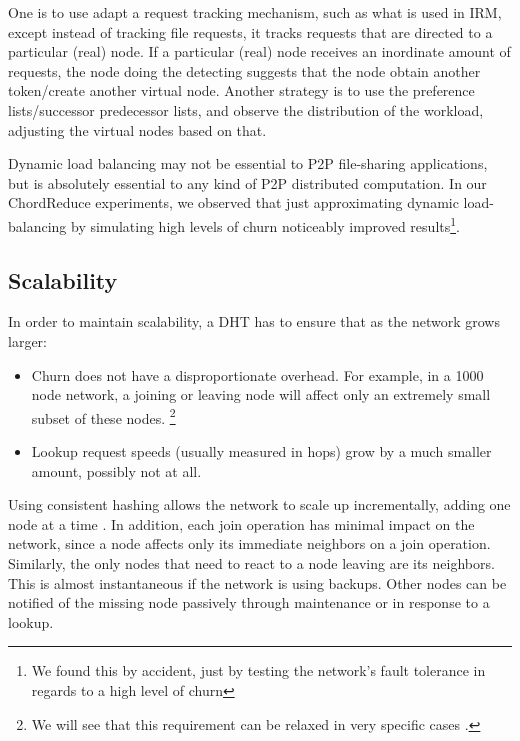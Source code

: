 \documentclass[10pt,letterpaper,twoside]{report}
\begin{document}
One is to use adapt a request tracking mechanism, such as what is used in IRM, except instead of tracking file requests, it tracks requests that are directed to a particular (real) node. 
If a particular (real) node receives an inordinate amount of requests, the node doing the detecting suggests that the node obtain another token/create another virtual node.
Another strategy is to use the preference lists/successor predecessor lists, and observe the distribution of the workload, adjusting the virtual nodes based on that. 

Dynamic load balancing may not be essential to P2P file-sharing applications, but is absolutely essential to any kind of P2P distributed computation.
In our ChordReduce experiments, we observed that just approximating dynamic load-balancing by simulating high levels of churn noticeably improved results\footnote{We found this by accident, just by testing the network's fault tolerance in regards to a high level of churn}.




\subsection{Scalability}
\label{subsec:scalability}
In order to maintain scalability, a DHT has to ensure that as the network grows larger:

\begin{itemize}
    \item Churn does not have a disproportionate overhead.  
    For example, in a 1000 node network, a joining or leaving node will affect only an extremely small subset of these nodes.
    \footnote{We will see that this requirement can  be  relaxed in  very specific cases \cite{li2013zht}.}
    \item Lookup request speeds (usually measured in hops) grow by a much smaller amount, possibly not at all.
\end{itemize}

Using consistent hashing allows the network to scale up incrementally, adding one node at a time \cite{dynamo}.
In addition, each join operation has minimal impact on the network, since a node affects only its immediate neighbors on a join operation.
Similarly, the only nodes that need to react to a node leaving are its neighbors.
This is almost instantaneous if the network is using backups.
Other nodes can be notified of the missing node passively through maintenance or in response to a lookup.
\end{document}
